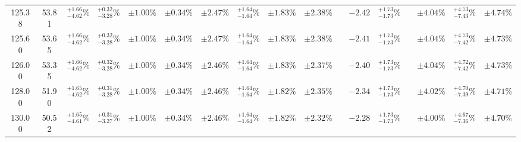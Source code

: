 \begin{landscape}
\begin{table}[ht!]
{\begin{tabular}{| cc | cccc | ccc | c |@{}c@{\;}| cc |@{}c@{\;}| ccc |}
125.38 & 53.81 & \({}^{ +1.66}_{ -4.62}\%\) & {\color{black!55}\({}^{ +0.32}_{ -3.28}\%\)} & {\color{black!55}\(\pm{  1.00}\%\)} & {\color{black!55}\(\pm{  0.34}\%\)} & \(\pm 2.47\%\) & {\color{black!55}\({}^{ +1.64}_{ -1.64}\%\)} & {\color{black!55}\(\pm 1.83\%\)} & \(\pm{  2.38}\%\) &  & \(-2.42\) & \({}^{ +1.73}_{ -1.73}\%\) &  & \(\pm 4.04\%\) & \({}^{ +4.73}_{ -7.43}\%\) & \(\pm 4.74\%\)\\
125.60 & 53.65 & \({}^{ +1.66}_{ -4.62}\%\) & {\color{black!55}\({}^{ +0.32}_{ -3.28}\%\)} & {\color{black!55}\(\pm{  1.00}\%\)} & {\color{black!55}\(\pm{  0.34}\%\)} & \(\pm 2.47\%\) & {\color{black!55}\({}^{ +1.64}_{ -1.64}\%\)} & {\color{black!55}\(\pm 1.83\%\)} & \(\pm{  2.38}\%\) &  & \(-2.41\) & \({}^{ +1.73}_{ -1.73}\%\) &  & \(\pm 4.04\%\) & \({}^{ +4.73}_{ -7.42}\%\) & \(\pm 4.73\%\)\\
126.00 & 53.35 & \({}^{ +1.66}_{ -4.62}\%\) & {\color{black!55}\({}^{ +0.32}_{ -3.28}\%\)} & {\color{black!55}\(\pm{  1.00}\%\)} & {\color{black!55}\(\pm{  0.34}\%\)} & \(\pm 2.46\%\) & {\color{black!55}\({}^{ +1.64}_{ -1.64}\%\)} & {\color{black!55}\(\pm 1.83\%\)} & \(\pm{  2.37}\%\) &  & \(-2.40\) & \({}^{ +1.73}_{ -1.73}\%\) &  & \(\pm 4.04\%\) & \({}^{ +4.72}_{ -7.42}\%\) & \(\pm 4.73\%\)\\
128.00 & 51.90 & \({}^{ +1.65}_{ -4.62}\%\) & {\color{black!55}\({}^{ +0.31}_{ -3.28}\%\)} & {\color{black!55}\(\pm{  1.00}\%\)} & {\color{black!55}\(\pm{  0.34}\%\)} & \(\pm 2.46\%\) & {\color{black!55}\({}^{ +1.64}_{ -1.64}\%\)} & {\color{black!55}\(\pm 1.82\%\)} & \(\pm{  2.35}\%\) &  & \(-2.34\) & \({}^{ +1.73}_{ -1.73}\%\) &  & \(\pm 4.02\%\) & \({}^{ +4.70}_{ -7.39}\%\) & \(\pm 4.71\%\)\\
130.00 & 50.52 & \({}^{ +1.65}_{ -4.61}\%\) & {\color{black!55}\({}^{ +0.31}_{ -3.27}\%\)} & {\color{black!55}\(\pm{  1.00}\%\)} & {\color{black!55}\(\pm{  0.34}\%\)} & \(\pm 2.46\%\) & {\color{black!55}\({}^{ +1.64}_{ -1.64}\%\)} & {\color{black!55}\(\pm 1.82\%\)} & \(\pm{  2.32}\%\) &  & \(-2.28\) & \({}^{ +1.73}_{ -1.73}\%\) &  & \(\pm 4.00\%\) & \({}^{ +4.67}_{ -7.36}\%\) & \(\pm 4.70\%\)\\
\cline{1-10} \cline{12-13} \cline{15-17}
\end{tabular}
}
\end{table}

\end{landscape}
